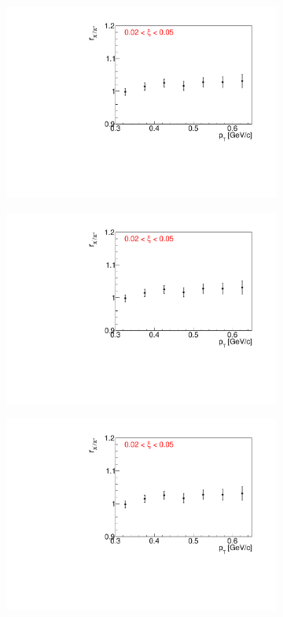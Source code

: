 \begin{figure}[h!]
\begin{subfigure}{.32\textwidth}
		\includegraphics[width=\linewidth, page=7]{chapters/chrgSTAR/img/dEdx/fit2019_fitResult_1_0_step_0.pdf}
	\end{subfigure}
	\begin{subfigure}{.32\textwidth}
		\includegraphics[width=\linewidth, page=8]{chapters/chrgSTAR/img/dEdx/fit2019_fitResult_1_0_step_0.pdf}
	\end{subfigure}
	\begin{subfigure}{.32\textwidth}
		\includegraphics[width=\linewidth, page=11]{chapters/chrgSTAR/img/dEdx/fit2019_fitResult_1_0_step_0.pdf}

\end{subfigure}
\end{figure}
